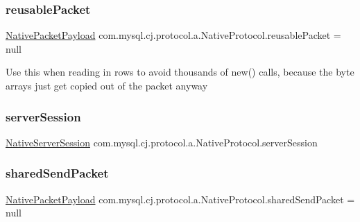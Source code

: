 \subsubsection{\texorpdfstring{reusable\+Packet}{reusablePacket}}
{\footnotesize\ttfamily \mbox{\hyperlink{classcom_1_1mysql_1_1cj_1_1protocol_1_1a_1_1_native_packet_payload}{Native\+Packet\+Payload}} com.\+mysql.\+cj.\+protocol.\+a.\+Native\+Protocol.\+reusable\+Packet = null\hspace{0.3cm}{\ttfamily [protected]}}

Use this when reading in rows to avoid thousands of new() calls, because the byte arrays just get copied out of the packet anyway \mbox{\label{classcom_1_1mysql_1_1cj_1_1protocol_1_1a_1_1_native_protocol_afc3a2eecce6580bb77f9c6564d652482}} 
\subsubsection{\texorpdfstring{server\+Session}{serverSession}}
{\footnotesize\ttfamily \mbox{\hyperlink{classcom_1_1mysql_1_1cj_1_1protocol_1_1a_1_1_native_server_session}{Native\+Server\+Session}} com.\+mysql.\+cj.\+protocol.\+a.\+Native\+Protocol.\+server\+Session\hspace{0.3cm}{\ttfamily [protected]}}

\mbox{\label{classcom_1_1mysql_1_1cj_1_1protocol_1_1a_1_1_native_protocol_a78f6d0f4e7668aad319c35d72b469dc0}} 
\subsubsection{\texorpdfstring{shared\+Send\+Packet}{sharedSendPacket}}
{\footnotesize\ttfamily \mbox{\hyperlink{classcom_1_1mysql_1_1cj_1_1protocol_1_1a_1_1_native_packet_payload}{Native\+Packet\+Payload}} com.\+mysql.\+cj.\+protocol.\+a.\+Native\+Protocol.\+shared\+Send\+Packet = null\hspace{0.3cm}{\ttfamily [protected]}}

